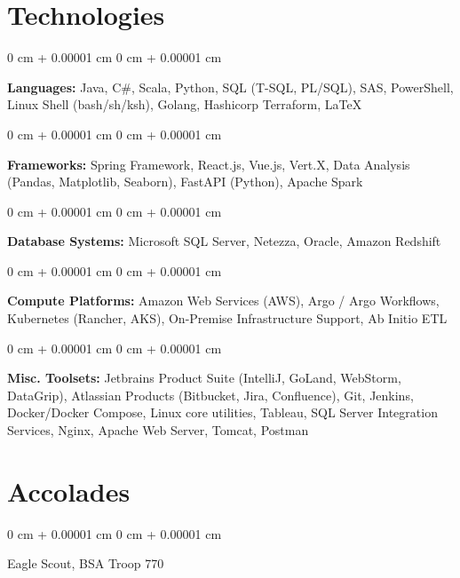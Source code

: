 \documentclass[10pt, letterpaper]{article}
\newenvironment{onecolentry}{
    \begin{adjustwidth}{
        0 cm + 0.00001 cm
    }{
        0 cm + 0.00001 cm
    }
}{
    \end{adjustwidth}
} %
\newenvironment{twocolentry}[2][]{
    \onecolentry
    \def\secondColumn{#2}
    \setcolumnwidth{\fill, 4.5 cm}
    \begin{paracol}{2}
}{
    \switchcolumn \raggedleft \secondColumn
    \end{paracol}
    \endonecolentry
} %
\begin{document}
\vspace{0.2 cm}
    
    \section{Technologies}



        
        \begin{onecolentry}
            \textbf{Languages:} Java, C\#, Scala, Python, SQL (T-SQL, PL/SQL), SAS, PowerShell, Linux Shell (bash/sh/ksh), Golang, Hashicorp Terraform, \LaTeX
        \end{onecolentry}

        \vspace{0.2 cm}
        
        \begin{onecolentry}
            \textbf{Frameworks:} Spring Framework, React.js, Vue.js, Vert.X, Data Analysis (Pandas, Matplotlib, Seaborn), FastAPI (Python), Apache Spark
        \end{onecolentry}

        \vspace{0.2 cm}

        \begin{onecolentry}
            \textbf{Database Systems:} Microsoft SQL Server, Netezza, Oracle, Amazon Redshift
        \end{onecolentry}
        
        \vspace{0.2 cm}

        \begin{onecolentry}
            \textbf{Compute Platforms:} Amazon Web Services (AWS), Argo / Argo Workflows, Kubernetes (Rancher, AKS), On-Premise Infrastructure Support, Ab Initio ETL
        \end{onecolentry}

        \vspace{0.2 cm}

        \begin{onecolentry}
            \textbf{Misc. Toolsets:} Jetbrains Product Suite (IntelliJ, GoLand, WebStorm, DataGrip), Atlassian Products (Bitbucket, Jira, Confluence), Git, Jenkins, Docker/Docker Compose, Linux core utilities, Tableau, SQL Server Integration Services, Nginx, Apache Web Server, Tomcat, Postman
        \end{onecolentry}
    
\vspace{0.2 cm}

    \section{Accolades}

        \begin{twocolentry}{
            2009
        }
            Eagle Scout, BSA Troop 770
        \end{twocolentry}
    
\end{document}
